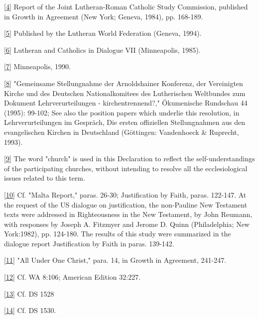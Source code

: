 \hyperref[r4]{}\label{4}{}{[}\hyperref[r4]{4}{]} Report
of the Joint Lutheran-Roman Catholic Study Commission, published in
Growth in Agreement (New York; Geneva, 1984), pp. 168-189.

\hyperref[r5]{}\label{5}{}{[}\hyperref[r5]{5}{]}
Published by the Lutheran World Federation (Geneva, 1994).

\hyperref[r6]{}\label{6}{}{[}\hyperref[r6]{6}{]} Lutheran
and Catholics in Dialogue VII (Minneapolis, 1985).

\hyperref[r7]{}\label{7}{}{[}\hyperref[r7]{7}{]}
Minneapolis, 1990.

\hyperref[r8]{}\label{8}{}{[}\hyperref[r8]{8}{]}
"Gemeinsame Stellungnahme der Arnoldshainer Konferenz, der Vereinigten
Kirche und des Deutschen Nationalkomitees des Lutherischen Weltbundes
zum Dokument \textquotesingle Lehrverurteilungen -
kirchentrennend?\textquotesingle," Ökumenische Rundschau 44 (1995):
99-102; See also the position papers which underlie this resolution, in
Lehrverurteilungen im Gespräch, Die ersten offiziellen Stellungnahmen
aus den evangelischen Kirchen in Deutschland (Göttingen: Vandenhoeck \&
Ruprecht, 1993).

\hyperref[r9]{}\label{9}{}{[}\hyperref[r9]{9}{]} The word
"church" is used in this Declaration to reflect the self-understandings
of the participating churches, without intending to resolve all the
ecclesiological issues related to this term.

\hyperref[r10]{}\label{10}{}{[}\hyperref[r10]{10}{]} Cf.
"Malta Report," paras. 26-30; Justification by Faith, paras. 122-147. At
the request of the US dialogue on justification, the non-Pauline New
Testament texts were addressed in Righteousness in the New Testament, by
John Reumann, with responses by Joseph A. Fitzmyer and Jerome D. Quinn
(Philadelphia; New York:1982), pp. 124-180. The results of this study
were summarized in the dialogue report Justification by Faith in paras.
139-142.

\hyperref[r11]{}\label{11}{}{[}\hyperref[r11]{11}{]} "All
Under One Christ," para. 14, in Growth in Agreement, 241-247.

\hyperref[r12]{}\label{12}{}{[}\hyperref[r12]{12}{]} Cf.
WA 8:106; American Edition 32:227.

\hyperref[r13]{}\label{13}{}{[}\hyperref[r13]{13}{]} Cf.
DS 1528

\hyperref[r14]{}\label{14}{}{[}\hyperref[r14]{14}{]} Cf.
DS 1530.

